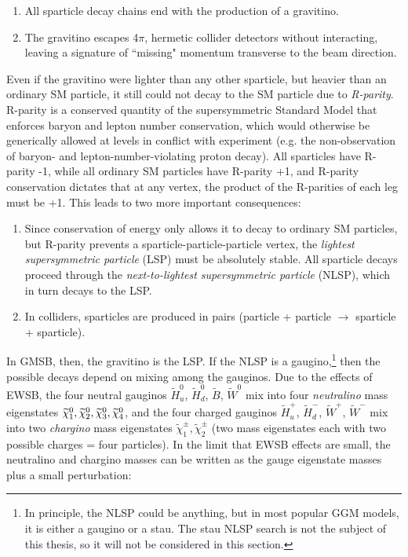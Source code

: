 \documentclass[dissertation.tex]{subfiles}
\begin{document}
\begin{enumerate}
  \item All sparticle decay chains end with the production of a gravitino.
  \item The gravitino escapes 4$\pi$, hermetic collider detectors without interacting, leaving a signature of ``missing" momentum transverse to the beam direction.
\end{enumerate}

Even if the gravitino were lighter than any other sparticle, but heavier than an ordinary SM particle, it still could not decay to the SM particle due to \textit{R-parity}.  R-parity is a conserved quantity of the supersymmetric Standard Model that enforces baryon and lepton number conservation, which would otherwise be generically allowed at levels in conflict with experiment (e.g. the non-observation of baryon- and lepton-number-violating proton decay).  All sparticles have R-parity -1, while all ordinary SM particles have R-parity +1, and R-parity conservation dictates that at any vertex, the product of the R-parities of each leg must be +1.  This leads to two more important consequences:

\begin{enumerate}
  \item Since conservation of energy only allows it to decay to ordinary SM particles, but R-parity prevents a sparticle-particle-particle vertex, the \textit{lightest supersymmetric particle} (LSP) must be absolutely stable.  All sparticle decays proceed through the \textit{next-to-lightest supersymmetric particle} (NLSP), which in turn decays to the LSP.
  \item In colliders, sparticles are produced in pairs (particle + particle $\rightarrow$ sparticle + sparticle).
\end{enumerate}

In GMSB, then, the gravitino is the LSP.  If the NLSP is a gaugino,\footnote{In principle, the NLSP could be anything, but in most popular GGM models, it is either a gaugino or a stau.  The stau NLSP search is not the subject of this thesis, so it will not be considered in this section.} then the possible decays depend on mixing among the gauginos.  Due to the effects of EWSB, the four neutral gauginos $\widetilde{H}_{u}^{0}$, $\widetilde{H}_{d}^{0}$, $\widetilde{B}$, $\widetilde{W}^{0}$ mix into four \textit{neutralino} mass eigenstates $\widetilde{\chi}_{1}^{0}, \widetilde{\chi}_{2}^{0}, \widetilde{\chi}_{3}^{0}, \widetilde{\chi}_{4}^{0}$, and the four charged gauginos $\widetilde{H}_{u}^{+}$, $\widetilde{H}_{d}^{-}$, $\widetilde{W}^{+}$, $\widetilde{W}^{-}$ mix into two \textit{chargino} mass eigenstates $\widetilde{\chi}_{1}^{\pm}, \widetilde{\chi}_{2}^{\pm}$ (two mass eigenstates each with two possible charges = four particles).  In the limit that EWSB effects are small, the neutralino and chargino masses can be written as the gauge eigenstate masses plus a small perturbation:
\end{document}
